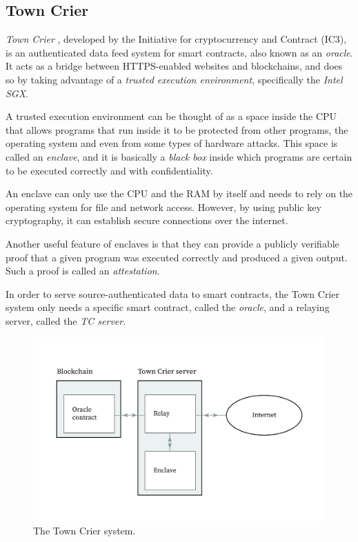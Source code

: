 \documentclass[conference]{IEEEtran}
\begin{document}
\subsection{Town Crier}
\textit{Town Crier} \cite{zhang2016town}, developed by the Initiative for cryptocurrency and Contract (IC3), is an authenticated data feed system for smart contracts, also known as an \textit{oracle}. It acts as a bridge between HTTPS-enabled websites and blockchains, and does so by taking advantage of a \textit{trusted execution environment}, specifically the \textit{Intel SGX}.

A trusted execution environment can be thought of as a space inside the CPU that allows programs that run inside it to be protected from other programs, the operating system and even from some types of hardware attacks. This space is called an \textit{enclave}, and it is basically a \textit{black box} inside which programs are certain to be executed correctly and with confidentiality.

An enclave can only use the CPU and the RAM by itself and needs to rely on the operating system for file and network access. However, by using public key cryptography, it can establish secure connections over the internet.

Another useful feature of enclaves is that they can provide a publicly verifiable proof that a given program was executed correctly and produced a given output. Such a proof is called an \textit{attestation}.

In order to serve source-authenticated data to smart contracts, the Town Crier system only needs a specific smart contract, called the \textit{oracle}, and a relaying server, called the \textit{TC server}.

\begin{figure}[h]
	\includegraphics[width=\linewidth]{images/town_crier.jpg}
	\caption{The Town Crier system.}
\end{figure}
\end{document}
